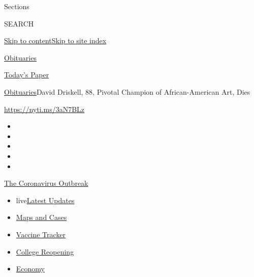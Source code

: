 Sections

SEARCH

\protect\hyperlink{site-content}{Skip to
content}\protect\hyperlink{site-index}{Skip to site index}

\href{https://www.nytimes3xbfgragh.onion/section/obituaries}{Obituaries}

\href{https://myaccount.nytimes3xbfgragh.onion/auth/login?response_type=cookie\&client_id=vi}{}

\href{https://www.nytimes3xbfgragh.onion/section/todayspaper}{Today's
Paper}

\href{/section/obituaries}{Obituaries}\textbar{}David Driskell, 88,
Pivotal Champion of African-American Art, Dies

\url{https://nyti.ms/3aN7BLz}

\begin{itemize}
\item
\item
\item
\item
\item
\end{itemize}

\href{https://www.nytimes3xbfgragh.onion/news-event/coronavirus?action=click\&pgtype=Article\&state=default\&region=TOP_BANNER\&context=storylines_menu}{The
Coronavirus Outbreak}

\begin{itemize}
\tightlist
\item
  live\href{https://www.nytimes3xbfgragh.onion/2020/08/04/world/coronavirus-covid-19.html?action=click\&pgtype=Article\&state=default\&region=TOP_BANNER\&context=storylines_menu}{Latest
  Updates}
\item
  \href{https://www.nytimes3xbfgragh.onion/interactive/2020/us/coronavirus-us-cases.html?action=click\&pgtype=Article\&state=default\&region=TOP_BANNER\&context=storylines_menu}{Maps
  and Cases}
\item
  \href{https://www.nytimes3xbfgragh.onion/interactive/2020/science/coronavirus-vaccine-tracker.html?action=click\&pgtype=Article\&state=default\&region=TOP_BANNER\&context=storylines_menu}{Vaccine
  Tracker}
\item
  \href{https://www.nytimes3xbfgragh.onion/2020/08/02/us/covid-college-reopening.html?action=click\&pgtype=Article\&state=default\&region=TOP_BANNER\&context=storylines_menu}{College
  Reopening}
\item
  \href{https://www.nytimes3xbfgragh.onion/live/2020/08/03/business/stock-market-today-coronavirus?action=click\&pgtype=Article\&state=default\&region=TOP_BANNER\&context=storylines_menu}{Economy}
\end{itemize}

